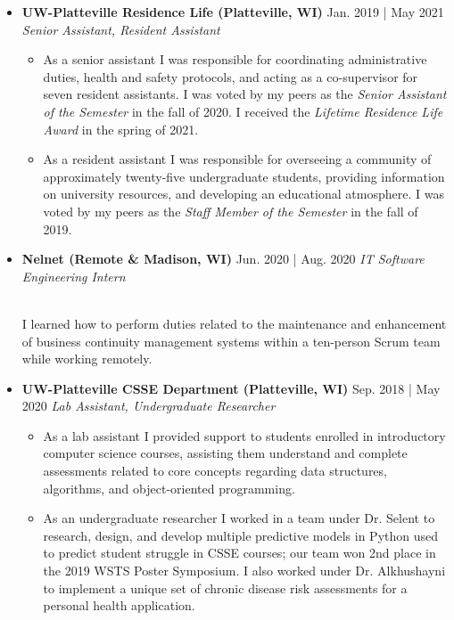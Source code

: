 \documentclass[11pt]{article}
\newcommand{\job}[3]{\vspace{1.5mm}
  \textbf{#1} \hfill #2 \linebreak \textit{#3}
}
\begin{document}
\begin{itemize}[leftmargin=*]
\begin{itemize}
	      \end{itemize}
	\item[]
	      \job
	      {UW-Platteville Residence Life (Platteville, WI)}
	      {Jan. 2019 | May 2021}
	      {Senior Assistant, Resident Assistant}
	      \begin{itemize}
	      	\item As a senior assistant I was responsible for coordinating administrative duties, health and safety protocols, and acting as a co-supervisor for seven resident assistants. I was voted by my peers as the \emph{Senior Assistant of the Semester} in the fall of 2020. I received the \emph{Lifetime Residence Life Award} in the spring of 2021.
	      	\item As a resident assistant I was responsible for overseeing a community of approximately twenty-five undergraduate students, providing information on university resources, and developing an educational atmosphere. I was voted by my peers as the \emph{Staff Member of the Semester} in the fall of 2019.
	      \end{itemize}
	\item[]
	      \job
	      {Nelnet (Remote \& Madison, WI)}
	      {Jun. 2020 | Aug. 2020}
	      {IT Software Engineering Intern}
	      {\\I learned how to perform duties related to the maintenance and enhancement of business continuity management systems within a ten-person Scrum team while working remotely.}
	\item[]
	      \job
	      {UW-Platteville CSSE Department (Platteville, WI)}
	      {Sep. 2018 | May 2020}
	      {Lab Assistant, Undergraduate Researcher}
	      \begin{itemize}
		\item As a lab assistant I provided support to students enrolled in introductory computer science courses, assisting them understand and complete assessments related to core concepts regarding data structures, algorithms, and object-oriented programming.
	      	\item As an undergraduate researcher I worked in a team under Dr. Selent to research, design, and develop multiple predictive models in Python used to predict student struggle in CSSE courses; our team won 2nd place in the 2019 WSTS Poster Symposium. I also worked under Dr. Alkhushayni to implement a unique set of chronic disease risk assessments for a personal health application.
	      \end{itemize}
\end{itemize}
\end{document}
